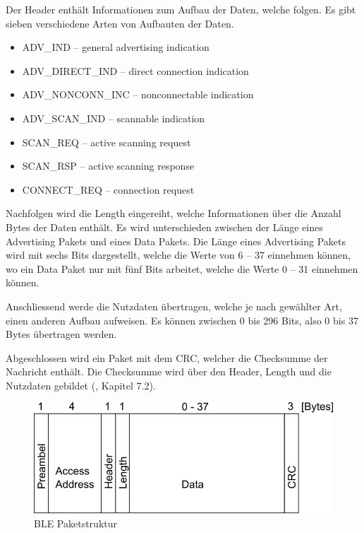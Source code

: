 Der Header enthält Informationen zum Aufbau der Daten, welche folgen. Es gibt sieben verschiedene Arten von Aufbauten der Daten.
\begin{itemize}
    \item ADV\_IND – general advertising indication
    \item ADV\_DIRECT\_IND – direct connection indication
    \item ADV\_NONCONN\_INC – nonconnectable indication
    \item ADV\_SCAN\_IND – scannable indication
    \item SCAN\_REQ – active scanning request
    \item SCAN\_RSP – active scanning response
    \item CONNECT\_REQ – connection request
\end{itemize}

Nachfolgen wird die Length eingereiht, welche Informationen über die Anzahl Bytes der Daten enthält. Es wird unterschieden zwischen der Länge eines Advertising Pakets und eines Data Pakets. Die Länge eines Advertising Pakets wird mit sechs Bits dargestellt, welche die Werte von 6 – 37 einnehmen können, wo ein Data Paket nur mit fünf Bits arbeitet, welche die Werte 0 – 31 einnehmen können.

Anschliessend werde die Nutzdaten übertragen, welche je nach gewählter Art, einen anderen Aufbau aufweisen. Es können zwischen 0 bis 296 Bits, also 0 bis 37 Bytes übertragen werden. 

Abgeschlossen wird ein Paket mit dem CRC, welcher die Checksumme der Nachricht enthält. Die Checksumme wird über den Header, Length und die Nutzdaten gebildet (\cite{BLE_Book}, Kapitel 7.2).


\begin{figure}[ht]
    \includegraphics[width=1.0\textwidth]{2TheoretischeGrundlagen/imag/BLEPaketstruktur.png}
    \caption{BLE Paketstruktur}
    \label{ble_paket} 
\end{figure}



